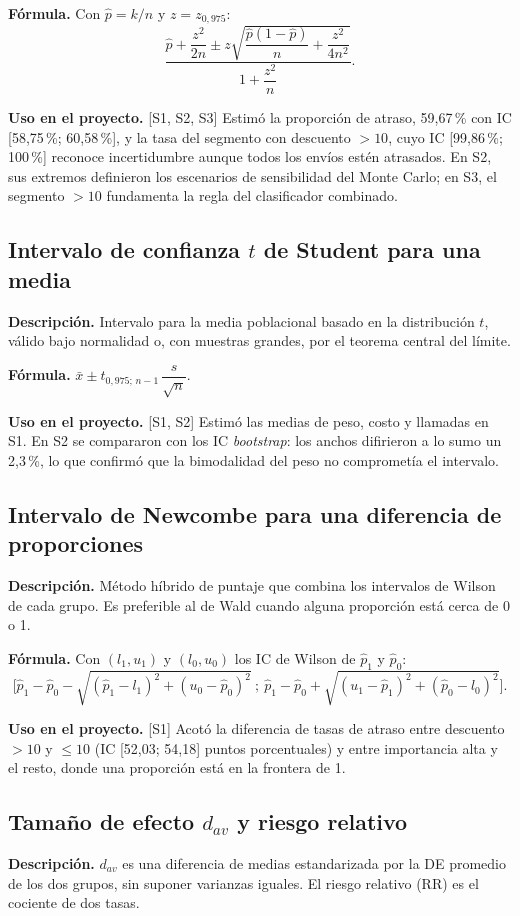 \documentclass[11pt,a4paper]{article}
\newcommand{\desc}{\textbf{Descripción.} }
\newcommand{\formula}{\textbf{Fórmula.} }
\newcommand{\uso}{\textbf{Uso en el proyecto.} }
\newcommand{\fase}[1]{{\footnotesize\color{gris}[#1]}}
\begin{document}
\formula Con $\hat p=k/n$ y $z=z_{0,975}$:
\[
\frac{\hat p+\dfrac{z^2}{2n}\pm z\sqrt{\dfrac{\hat p(1-\hat p)}{n}+\dfrac{z^2}{4n^2}}}{1+\dfrac{z^2}{n}} .
\]

\uso \fase{S1, S2, S3} Estimó la proporción de atraso, 59,67\,\% con IC [58,75\,\%; 60,58\,\%], y la tasa del segmento con descuento $>10$, cuyo IC [99,86\,\%; 100\,\%] reconoce incertidumbre aunque todos los envíos estén atrasados. En S2, sus extremos definieron los escenarios de sensibilidad del Monte Carlo; en S3, el segmento $>10$ fundamenta la regla del clasificador combinado.

\subsection{Intervalo de confianza $t$ de Student para una media}
\desc Intervalo para la media poblacional basado en la distribución $t$, válido bajo normalidad o, con muestras grandes, por el teorema central del límite.

\formula $\bar x\pm t_{0,975;\,n-1}\,\dfrac{s}{\sqrt n}$.

\uso \fase{S1, S2} Estimó las medias de peso, costo y llamadas en S1. En S2 se compararon con los IC \emph{bootstrap}: los anchos difirieron a lo sumo un 2,3\,\%, lo que confirmó que la bimodalidad del peso no comprometía el intervalo.

\subsection{Intervalo de Newcombe para una diferencia de proporciones}
\desc Método híbrido de puntaje que combina los intervalos de Wilson de cada grupo. Es preferible al de Wald cuando alguna proporción está cerca de 0 o 1.

\formula Con $(l_1,u_1)$ y $(l_0,u_0)$ los IC de Wilson de $\hat p_1$ y $\hat p_0$:
\[
\Big[\hat p_1-\hat p_0-\sqrt{(\hat p_1-l_1)^2+(u_0-\hat p_0)^2}\ ;\ \hat p_1-\hat p_0+\sqrt{(u_1-\hat p_1)^2+(\hat p_0-l_0)^2}\Big].
\]

\uso \fase{S1} Acotó la diferencia de tasas de atraso entre descuento $>10$ y $\le10$ (IC [52,03; 54,18] puntos porcentuales) y entre importancia alta y el resto, donde una proporción está en la frontera de 1.

\subsection{Tamaño de efecto $d_{av}$ y riesgo relativo}
\desc $d_{av}$ es una diferencia de medias estandarizada por la DE promedio de los dos grupos, sin suponer varianzas iguales. El riesgo relativo (RR) es el cociente de dos tasas.
\end{document}

